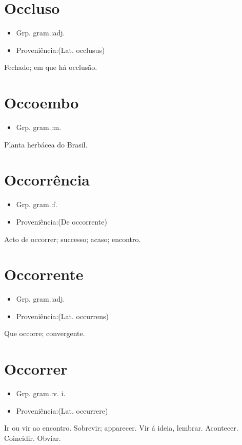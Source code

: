 \section{Occluso}
\begin{itemize}
\item {Grp. gram.:adj.}
\end{itemize}
\begin{itemize}
\item {Proveniência:(Lat. \textunderscore occlusus\textunderscore )}
\end{itemize}
Fechado; em que há occlusão.
\section{Occoembo}
\begin{itemize}
\item {Grp. gram.:m.}
\end{itemize}
Planta herbácea do Brasil.
\section{Occorrência}
\begin{itemize}
\item {Grp. gram.:f.}
\end{itemize}
\begin{itemize}
\item {Proveniência:(De \textunderscore occorrente\textunderscore )}
\end{itemize}
Acto de occorrer; successo; acaso; encontro.
\section{Occorrente}
\begin{itemize}
\item {Grp. gram.:adj.}
\end{itemize}
\begin{itemize}
\item {Proveniência:(Lat. \textunderscore occurrens\textunderscore )}
\end{itemize}
Que occorre; convergente.
\section{Occorrer}
\begin{itemize}
\item {Grp. gram.:v. i.}
\end{itemize}
\begin{itemize}
\item {Proveniência:(Lat. \textunderscore occurrere\textunderscore )}
\end{itemize}
Ir ou vir ao encontro.
Sobrevir; apparecer.
Vir á ideia, lembrar.
Acontecer.
Coincidir.
Obviar.
